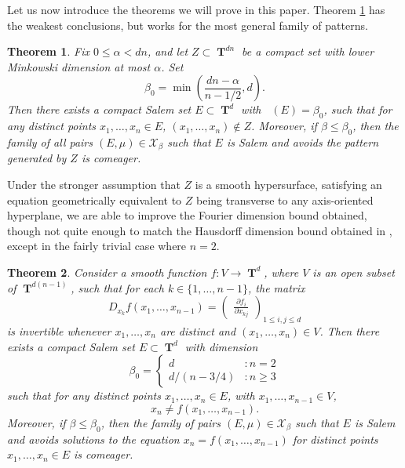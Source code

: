 \documentclass[dvipsnames,letterpaper,12pt]{article}
\numberwithin{equation}{section}
\DeclareMathOperator{\fordim}{\dim_{\mathbf{F}}}
\DeclareMathOperator{\TT}{\mathbf{T}}
\newtheorem{theorem}{Theorem}
\numberwithin{theorem}{section}
\begin{document}

Let us now introduce the theorems we will prove in this paper. Theorem \ref{maintheorem} has the weakest conclusions, but works for the most general family of patterns.

\begin{theorem} \label{maintheorem}
    Fix $0 \leq \alpha < dn$, and let $Z \subset \TT^{dn}$ be a compact set with lower Minkowski dimension at most $\alpha$. Set
    \[ \beta_0 = \min \left( \frac{dn - \alpha}{n-1/2}, d \right). \]
    Then there exists a compact Salem set $E \subset \TT^d$ with $\fordim(E) = \beta_0$, such that for any distinct points $x_1, \dots, x_n \in E$, $(x_1, \dots, x_n) \not \in Z$. Moreover, if $\beta \leq \beta_0$, then the family of all pairs $(E,\mu) \in \mathcal{X}_\beta$ such that $E$ is Salem and avoids the pattern generated by $Z$ is comeager.
\end{theorem}

Under the stronger assumption that $Z$ is a smooth hypersurface, satisfying an equation geometrically equivalent to $Z$ being transverse to any axis-oriented hyperplane, we are able to improve the Fourier dimension bound obtained, though not quite enough to match the Hausdorff dimension bound obtained in \cite{PramanikFraser}, except in the fairly trivial case where $n = 2$.

\begin{theorem} \label{theoremJOICVIOJVI122}
    Consider a smooth function $f: V \to \TT^d$, where $V$ is an open subset of $\TT^{d(n-1)}$, such that for each $k \in \{ 1, \dots, n-1 \}$, the matrix
    \[ D_{x_k} f(x_1,\dots,x_{n-1}) = \begin{pmatrix} \frac{\partial f_i}{\partial x_{kj}} \end{pmatrix}_{1 \leq i,j \leq d} \]
    is invertible whenever $x_1,\dots,x_n$ are distinct and $(x_1,\dots,x_n) \in V$. Then there exists a compact Salem set $E \subset \TT^d$ with dimension
    \[ \beta_0 = \begin{cases} d &: n = 2 \\ d/(n - 3/4) &: n \geq 3 \end{cases} \]
    such that for any distinct points $x_1, \dots, x_n \in E$, with $x_1,\dots,x_{n-1} \in V$,
    \[ x_n \neq f(x_1,\dots,x_{n-1}). \]
    Moreover, if $\beta \leq \beta_0$, then the family of pairs $(E,\mu) \in \mathcal{X}_\beta$ such that $E$ is Salem and avoids solutions to the equation $x_n = f(x_1,\dots,x_{n-1})$ for distinct points $x_1,\dots,x_n \in E$ is comeager.
\end{theorem}
\end{document}
